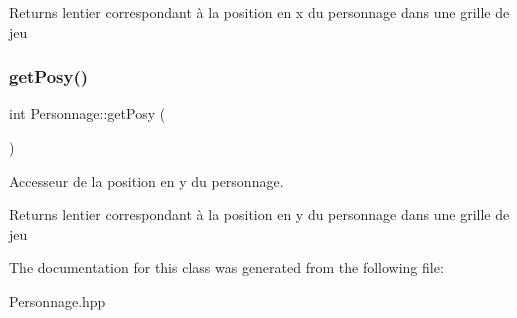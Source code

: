 \begin{DoxyReturn}{Returns}
l\textquotesingle{}entier correspondant à la position en x du personnage dans une grille de jeu 
\end{DoxyReturn}
\mbox{\label{classPersonnage_a37c205046e1f44503e296802b66a74cd}} 
\subsubsection{\texorpdfstring{get\+Posy()}{getPosy()}}
{\footnotesize\ttfamily int Personnage\+::get\+Posy (\begin{DoxyParamCaption}{ }\end{DoxyParamCaption})}



Accesseur de la position en y du personnage. 

\begin{DoxyReturn}{Returns}
l\textquotesingle{}entier correspondant à la position en y du personnage dans une grille de jeu 
\end{DoxyReturn}


The documentation for this class was generated from the following file\+:\begin{DoxyCompactItemize}
\item 
Personnage.\+hpp\end{DoxyCompactItemize}
